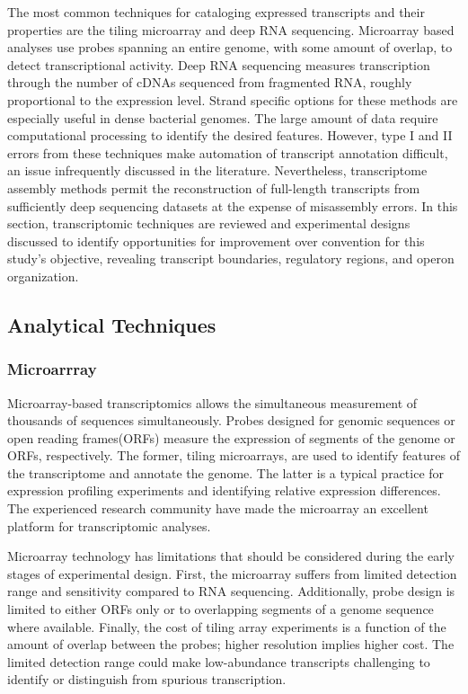 The most common techniques for cataloging expressed transcripts and their properties are the tiling microarray\cite{162} and deep RNA sequencing\cite{115}. Microarray based analyses use probes spanning an entire genome, with some amount of overlap, to detect transcriptional activity.\cite{197} Deep RNA sequencing\cite{115} measures transcription through the number of cDNAs sequenced from fragmented RNA, roughly proportional to the expression level.\cite{198} Strand specific options for these methods are especially useful in dense bacterial genomes.\cite{162,115} The large amount of data require computational processing to identify the desired features.\cite{199,200} However, type I and II errors from these techniques make automation of transcript annotation difficult, an issue infrequently discussed in the literature. Nevertheless, transcriptome assembly methods permit the reconstruction of full-length transcripts from sufficiently deep sequencing datasets at the expense of misassembly errors.\cite{108} In this section, transcriptomic techniques are reviewed and experimental designs discussed to identify opportunities for improvement over convention for this study's objective, revealing transcript boundaries, regulatory regions, and operon organization.

\subsection{Analytical Techniques}
\subsubsection{Microarrray}
Microarray-based transcriptomics allows the simultaneous measurement of thousands of sequences simultaneously.\cite{151} Probes designed for genomic sequences or open reading frames(ORFs) measure the expression of segments of the genome or ORFs, respectively. The former, tiling microarrays, are used to identify features of the transcriptome and annotate the genome. The latter is a typical practice for expression profiling experiments and identifying relative expression differences.\cite{151,162} The experienced research community have made the microarray an excellent platform for transcriptomic analyses.

Microarray technology has limitations that should be considered during the early stages of experimental design. First, the microarray suffers from limited detection range and sensitivity compared to RNA sequencing.\cite{163} Additionally, probe design is limited to either ORFs only or to overlapping segments of a genome sequence where available.\cite{153} Finally, the cost of tiling array experiments is a function of the amount of overlap between the probes; higher resolution implies higher cost.\cite{163} The limited detection range could make low-abundance transcripts challenging to identify or distinguish from spurious transcription.\cite{164,165}

